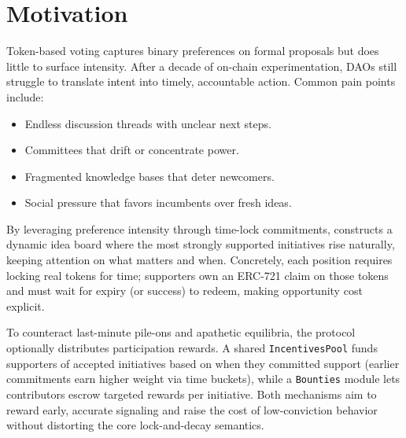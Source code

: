 \section{Motivation}
Token-based voting captures binary preferences on formal proposals but does little to surface intensity. After a decade of on-chain experimentation, DAOs still struggle to translate intent into timely, accountable action. Common pain points include:
\begin{itemize}[leftmargin=*]
  \item Endless discussion threads with unclear next steps.
  \item Committees that drift or concentrate power.
  \item Fragmented knowledge bases that deter newcomers.
  \item Social pressure that favors incumbents over fresh ideas.
\end{itemize}

By leveraging preference intensity through time-lock commitments, \signals{} constructs a dynamic idea board where the most strongly supported initiatives rise naturally, keeping attention on what matters and when. Concretely, each position requires locking real tokens for time; supporters own an ERC-721 claim on those tokens and must wait for expiry (or success) to redeem, making opportunity cost explicit.

To counteract last-minute pile-ons and apathetic equilibria, the protocol optionally distributes participation rewards. A shared \texttt{IncentivesPool} funds supporters of accepted initiatives based on when they committed support (earlier commitments earn higher weight via time buckets), while a \texttt{Bounties} module lets contributors escrow targeted rewards per initiative. Both mechanisms aim to reward early, accurate signaling and raise the cost of low-conviction behavior without distorting the core lock-and-decay semantics.
